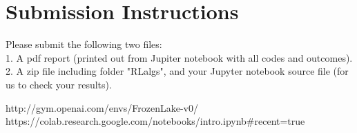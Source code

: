 \documentclass[letterpaper,12pt]{article}
\begin{document}
\section{Submission Instructions} \label{sec:submission}
Please submit the following two files: \\
1. A pdf report (printed out from Jupiter notebook with all codes and outcomes). \\
2. A zip file including folder "RLalgs", and your Jupyter notebook source file (for us to check your results).

\begin{thebibliography}{99}
 http://gym.openai.com/envs/FrozenLake-v0/
 https://colab.research.google.com/notebooks/intro.ipynb\#recent=true

\end{thebibliography}
\end{document}
